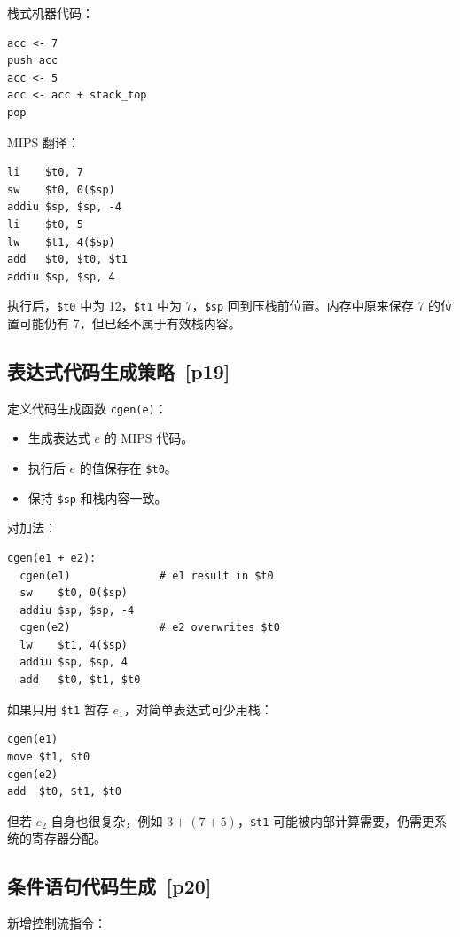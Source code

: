 \documentclass[UTF8,fontset=none,11pt]{ctexart}
\newcommand{\pg}[1]{\texorpdfstring{{\small\color{graytext}\,[p#1]}}{ [p#1]}}
\begin{document}
栈式机器代码：

\begin{verbatim}
acc <- 7
push acc
acc <- 5
acc <- acc + stack_top
pop
\end{verbatim}

MIPS 翻译：

\begin{verbatim}
li    $t0, 7
sw    $t0, 0($sp)
addiu $sp, $sp, -4
li    $t0, 5
lw    $t1, 4($sp)
add   $t0, $t0, $t1
addiu $sp, $sp, 4
\end{verbatim}

执行后，\texttt{\$t0} 中为 12，\texttt{\$t1} 中为 7，\texttt{\$sp} 回到压栈前位置。内存中原来保存 7 的位置可能仍有 7，但已经不属于有效栈内容。

\subsection{表达式代码生成策略 \pg{19}}

定义代码生成函数 \texttt{cgen(e)}：

\begin{itemize}
  \item 生成表达式 \(e\) 的 MIPS 代码。
  \item 执行后 \(e\) 的值保存在 \texttt{\$t0}。
  \item 保持 \texttt{\$sp} 和栈内容一致。
\end{itemize}

对加法：

\begin{verbatim}
cgen(e1 + e2):
  cgen(e1)              # e1 result in $t0
  sw    $t0, 0($sp)
  addiu $sp, $sp, -4
  cgen(e2)              # e2 overwrites $t0
  lw    $t1, 4($sp)
  addiu $sp, $sp, 4
  add   $t0, $t1, $t0
\end{verbatim}

如果只用 \texttt{\$t1} 暂存 \(e_1\)，对简单表达式可少用栈：

\begin{verbatim}
cgen(e1)
move $t1, $t0
cgen(e2)
add  $t0, $t1, $t0
\end{verbatim}

但若 \(e_2\) 自身也很复杂，例如 \(3+(7+5)\)，\texttt{\$t1} 可能被内部计算需要，仍需更系统的寄存器分配。

\subsection{条件语句代码生成 \pg{20}}

新增控制流指令：
\end{document}
